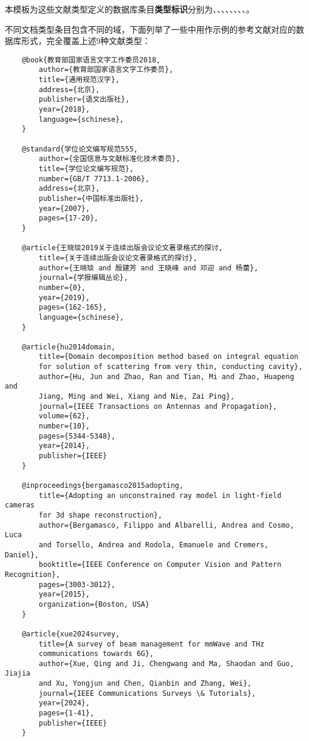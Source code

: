 \documentclass[doctor, vlined]{DissertUESTC}
\begin{document}
	本模板为这些文献类型定义的数据库条目\textbf{类型标识}分别为、、、、、、、、。
	
	不同文档类型条目包含不同的域，下面列举了一些\href{https://gr.uestc.edu.cn/xiazai/114/3917}{\color{DarkRed}}中用作示例的参考文献对应的数据库形式，完全覆盖上述9种文献类型：
	
	\begin{verbatim}
	@book{教育部国家语言文字工作委员2018,
	    author={教育部国家语言文字工作委员},
	    title={通用规范汉字},
	    address={北京},
	    publisher={语文出版社},
	    year={2018},
	    language={schinese},
	}
	
	@standard{学位论文编写规范555,
	    author={全国信息与文献标准化技术委员},
	    title={学位论文编写规范},
	    number={GB/T 7713.1-2006},
	    address={北京},
	    publisher={中国标准出版社},
	    year={2007},
	    pages={17-20},
	}
	
	@article{王晓琰2019关于连续出版会议论文著录格式的探讨,
	    title={关于连续出版会议论文著录格式的探讨},
	    author={王晓琰 and 殷建芳 and 王晓峰 and 邓迎 and 杨蕾},
	    journal={学报编辑丛论},
	    number={0},
	    year={2019},
	    pages={162-165},
	    language={schinese},
	}
	
	@article{hu2014domain,
	    title={Domain decomposition method based on integral equation
	    for solution of scattering from very thin, conducting cavity},
	    author={Hu, Jun and Zhao, Ran and Tian, Mi and Zhao, Huapeng and
	    Jiang, Ming and Wei, Xiang and Nie, Zai Ping},
	    journal={IEEE Transactions on Antennas and Propagation},
	    volume={62},
	    number={10},
	    pages={5344-5348},
	    year={2014},
	    publisher={IEEE}
	}
	
	@inproceedings{bergamasco2015adopting,
	    title={Adopting an unconstrained ray model in light-field cameras
	    for 3d shape reconstruction},
	    author={Bergamasco, Filippo and Albarelli, Andrea and Cosmo, Luca
	    and Torsello, Andrea and Rodola, Emanuele and Cremers, Daniel},
	    booktitle={IEEE Conference on Computer Vision and Pattern Recognition},
	    pages={3003-3012},
	    year={2015},
	    organization={Boston, USA}
	}
	
	@article{xue2024survey,
	    title={A survey of beam management for mmWave and THz
	    communications towards 6G},
	    author={Xue, Qing and Ji, Chengwang and Ma, Shaodan and Guo, Jiajia
	    and Xu, Yongjun and Chen, Qianbin and Zhang, Wei},
	    journal={IEEE Communications Surveys \& Tutorials},
	    year={2024},
	    pages={1-41},
	    publisher={IEEE}
	}
	

\end{verbatim}
\end{document}
